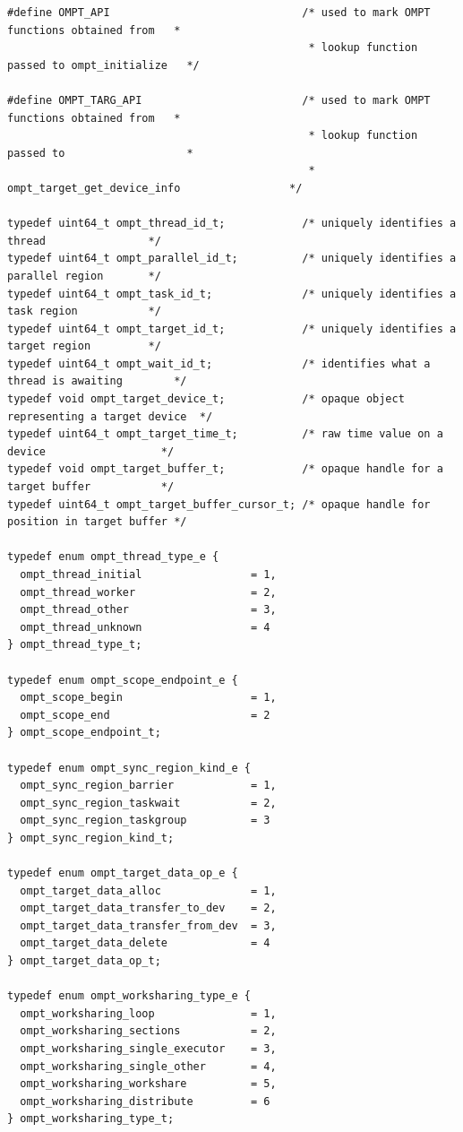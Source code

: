 \documentclass{article}
\begin{document}
\begin{verbatim}
#define OMPT_API                              /* used to mark OMPT functions obtained from   *
                                               * lookup function passed to ompt_initialize   */ 
                                             
#define OMPT_TARG_API                         /* used to mark OMPT functions obtained from   *
                                               * lookup function passed to                   *
                                               * ompt_target_get_device_info                 */
                                             
typedef uint64_t ompt_thread_id_t;            /* uniquely identifies a thread                */ 
typedef uint64_t ompt_parallel_id_t;          /* uniquely identifies a parallel region       */
typedef uint64_t ompt_task_id_t;              /* uniquely identifies a task region           */
typedef uint64_t ompt_target_id_t;            /* uniquely identifies a target region         */
typedef uint64_t ompt_wait_id_t;              /* identifies what a thread is awaiting        */
typedef void ompt_target_device_t;            /* opaque object representing a target device  */
typedef uint64_t ompt_target_time_t;          /* raw time value on a device                  */
typedef void ompt_target_buffer_t;            /* opaque handle for a target buffer           */ 
typedef uint64_t ompt_target_buffer_cursor_t; /* opaque handle for position in target buffer */

typedef enum ompt_thread_type_e {
  ompt_thread_initial                 = 1,
  ompt_thread_worker                  = 2,
  ompt_thread_other                   = 3,
  ompt_thread_unknown                 = 4
} ompt_thread_type_t;

typedef enum ompt_scope_endpoint_e {
  ompt_scope_begin                    = 1,
  ompt_scope_end                      = 2
} ompt_scope_endpoint_t;

typedef enum ompt_sync_region_kind_e {
  ompt_sync_region_barrier            = 1, 
  ompt_sync_region_taskwait           = 2,
  ompt_sync_region_taskgroup          = 3
} ompt_sync_region_kind_t;

typedef enum ompt_target_data_op_e {
  ompt_target_data_alloc              = 1,
  ompt_target_data_transfer_to_dev    = 2,
  ompt_target_data_transfer_from_dev  = 3,
  ompt_target_data_delete             = 4
} ompt_target_data_op_t;

typedef enum ompt_worksharing_type_e {
  ompt_worksharing_loop               = 1, 
  ompt_worksharing_sections           = 2,
  ompt_worksharing_single_executor    = 3,
  ompt_worksharing_single_other       = 4,
  ompt_worksharing_workshare          = 5,
  ompt_worksharing_distribute         = 6
} ompt_worksharing_type_t;


\end{verbatim}
\end{document}
